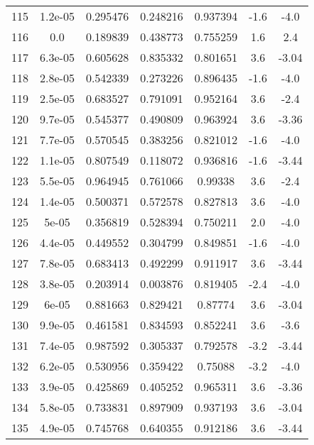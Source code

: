 \begin{table}
\begin{tabular}{c|c|c|c|c|c|c}
115 & 1.2e-05 & 0.295476 & 0.248216 & 0.937394 & -1.6 & -4.0\\
116 & 0.0 & 0.189839 & 0.438773 & 0.755259 & 1.6 & 2.4\\
117 & 6.3e-05 & 0.605628 & 0.835332 & 0.801651 & 3.6 & -3.04\\
118 & 2.8e-05 & 0.542339 & 0.273226 & 0.896435 & -1.6 & -4.0\\
119 & 2.5e-05 & 0.683527 & 0.791091 & 0.952164 & 3.6 & -2.4\\
120 & 9.7e-05 & 0.545377 & 0.490809 & 0.963924 & 3.6 & -3.36\\
121 & 7.7e-05 & 0.570545 & 0.383256 & 0.821012 & -1.6 & -4.0\\
122 & 1.1e-05 & 0.807549 & 0.118072 & 0.936816 & -1.6 & -3.44\\
123 & 5.5e-05 & 0.964945 & 0.761066 & 0.99338 & 3.6 & -2.4\\
124 & 1.4e-05 & 0.500371 & 0.572578 & 0.827813 & 3.6 & -4.0\\
125 & 5e-05 & 0.356819 & 0.528394 & 0.750211 & 2.0 & -4.0\\
126 & 4.4e-05 & 0.449552 & 0.304799 & 0.849851 & -1.6 & -4.0\\
127 & 7.8e-05 & 0.683413 & 0.492299 & 0.911917 & 3.6 & -3.44\\
128 & 3.8e-05 & 0.203914 & 0.003876 & 0.819405 & -2.4 & -4.0\\
129 & 6e-05 & 0.881663 & 0.829421 & 0.87774 & 3.6 & -3.04\\
130 & 9.9e-05 & 0.461581 & 0.834593 & 0.852241 & 3.6 & -3.6\\
131 & 7.4e-05 & 0.987592 & 0.305337 & 0.792578 & -3.2 & -3.44\\
132 & 6.2e-05 & 0.530956 & 0.359422 & 0.75088 & -3.2 & -4.0\\
133 & 3.9e-05 & 0.425869 & 0.405252 & 0.965311 & 3.6 & -3.36\\
134 & 5.8e-05 & 0.733831 & 0.897909 & 0.937193 & 3.6 & -3.04\\
135 & 4.9e-05 & 0.745768 & 0.640355 & 0.912186 & 3.6 & -3.44\\
\end{tabular}
\end{table}
\newpage
